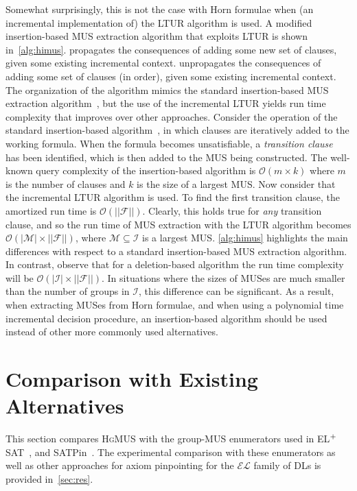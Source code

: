 \documentclass{llncs}
\newcommand{\tn}{\textnormal}
\newcommand{\fml}[1]{{\mathcal{#1}}}
\newcommand{\elplain}{$\fml{EL}$\xspace}
\newcommand{\hgmus}{\textsc{HgMUS}\xspace}
\newcommand{\elsat}{EL$^{\tn{+}}$SAT\xspace}
\begin{document}
Somewhat surprisingly, this is not the case with Horn formulae when
(an incremental implementation of) the LTUR algorithm is used.
A modified insertion-based MUS extraction algorithm that exploits LTUR
is shown in~\autoref{alg:himus}.
\prop propagates the consequences of adding some new set of clauses,
given some existing incremental context.
\undo unpropagates the consequences of adding some set of clauses (in
order), given some existing incremental context.
The organization of the algorithm mimics the standard insertion-based
MUS extraction algorithm~\cite{puget-ecai88}, but the use of the
incremental LTUR yields run time complexity that improves over other
approaches.
Consider the operation of the standard insertion-based
algorithm~\cite{puget-ecai88}, in which clauses are iteratively added
to the working formula. When the formula becomes unsatisfiable, a
{\em transition clause}~\cite{blms-aicomm12} has been identified,
which is then added to the MUS being constructed.
The well-known query complexity of the insertion-based algorithm is
$\fml{O}(m\times k)$ where $m$ is the number of clauses and $k$ is the
size of a largest MUS.
Now consider that the incremental LTUR algorithm is used. To find the
first transition clause, the amortized run time is
$\fml{O}(||\fml{F}||)$. Clearly, this holds true for {\em any}
transition clause, and so the run time of MUS extraction with the LTUR
algorithm becomes $\fml{O}(|\fml{M}|\times||\fml{F}||)$, where
$\fml{M}\subseteq\fml{I}$ is a largest MUS.
\autoref{alg:himus} highlights the main differences with respect to a
standard insertion-based MUS extraction algorithm.
In contrast, observe that for a deletion-based algorithm the run time
complexity will be $\fml{O}(|\fml{I}|\times||\fml{F}||)$. In
situations where the sizes of MUSes are much smaller than the number
of groups in $\fml{I}$, this difference can be significant. As a
result, when extracting MUSes from Horn formulae, and when using a
polynomial time incremental decision procedure, an insertion-based
algorithm should be used instead of other more commonly used
alternatives.


\section{Comparison with Existing Alternatives} \label{sec:relw}

This section compares \hgmus with the group-MUS enumerators used in
\elsat~\cite{sebastiani-cade09,sebastiani-tr15},
and SATPin~\cite{mp-tr15}.
The experimental comparison with these enumerators as well as other
approaches for axiom pinpointing for the \elplain family of DLs is
provided in~\autoref{sec:res}.
\end{document}
